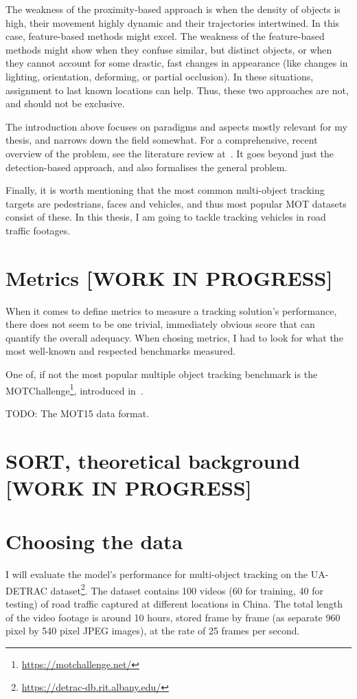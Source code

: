 The weakness of the proximity-based approach is when the density of objects is high, their movement highly dynamic and their trajectories intertwined. In this case, feature-based methods might excel. The weakness of the feature-based methods might show when they confuse similar, but distinct objects, or when they cannot account for some drastic, fast changes in appearance (like changes in lighting, orientation, deforming, or partial occlusion). In these situations, assignment to last known locations can help. Thus, these two approaches are not, and should not be exclusive.

The introduction above focuses on paradigms and aspects mostly relevant for my thesis, and narrows down the field somewhat. For a comprehensive, recent overview of the problem, see the literature review at~\cite{Luo_2021}. It goes beyond just the detection-based approach, and also formalises the general problem.

Finally, it is worth mentioning that the most common multi-object tracking targets are pedestrians, faces and vehicles, and thus most popular MOT datasets consist of these. In this thesis, I am going to tackle tracking vehicles in road traffic footages.

\section{Metrics [WORK IN PROGRESS]}

When it comes to define metrics to measure a tracking solution's performance, there does not seem to be one trivial, immediately obvious score that can quantify the overall adequacy. When chosing metrics, I had to look for what the most well-known and respected benchmarks measured.

One of, if not the most popular multiple object tracking benchmark is the MOTChallenge\footnote{\url{https://motchallenge.net/}}, introduced in~\cite{MOT15}.

TODO: The MOT15 data format.

\section{SORT, theoretical background [WORK IN PROGRESS]}


\section{Choosing the data}

I will evaluate the model's performance for multi-object tracking on the UA-DETRAC dataset\footnote{\url{https://detrac-db.rit.albany.edu/}}. The dataset contains 100 videos (60 for training, 40 for testing) of road traffic captured at different locations in China. The total length of the video footage is around 10 hours, stored frame by frame (as separate 960 pixel by 540 pixel JPEG images), at the rate of 25 frames per second.

